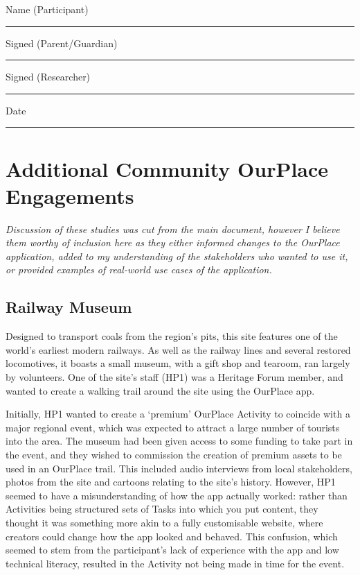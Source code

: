 \vspace{5mm}

Name (Participant) \rule{5cm}{0.15mm}

Signed (Parent/Guardian) \rule{5cm}{0.15mm}

Signed (Researcher) \rule{3cm}{0.15mm} Date \rule{2cm}{0.15mm}

\newpage

\section{Additional Community OurPlace Engagements}
\label{app:cutcommunityengagements}

\textit{Discussion of these studies was cut from the main document, however I believe them worthy of inclusion here as they either informed changes to the OurPlace application, added to my understanding of the stakeholders who wanted to use it, or provided examples of real-world use cases of the application. }

\subsection{Railway Museum}
\label{app:railwaymuseum}

Designed to transport coals from the region's pits, this site features one of the world's earliest modern railways. As well as the railway lines and several restored locomotives, it boasts a small museum, with a gift shop and tearoom, ran largely by volunteers. One of the site's staff (HP1) was a Heritage Forum member, and wanted to create a walking trail around the site using the OurPlace app.

Initially, HP1 wanted to create a `premium' OurPlace Activity to coincide with a major regional event, which was expected to attract a large number of tourists into the area. The museum had been given access to some funding to take part in the event, and they wished to commission the creation of premium assets to be used in an OurPlace trail. This included audio interviews from local stakeholders, photos from the site and cartoons relating to the site's history. However, HP1 seemed to have a misunderstanding of how the app actually worked: rather than Activities being structured sets of Tasks into which you put content, they thought it was something more akin to a fully customisable website, where creators could change how the app looked and behaved. This confusion, which seemed to stem from the participant's lack of experience with the app and low technical literacy, resulted in the Activity not being made in time for the event.

